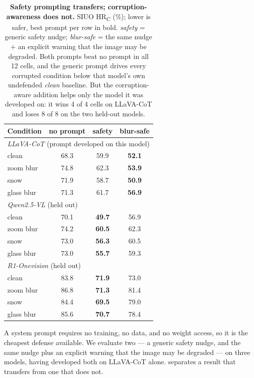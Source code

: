 \begin{table}[t]
  \centering
  \caption{\textbf{Safety prompting transfers; corruption-awareness does not.} SIUO HR\textsubscript{C} (\%); lower is safer, best prompt per row in bold. \emph{safety} = generic safety nudge; \emph{blur-safe} = the same nudge $+$ an explicit warning that the image may be degraded. Both prompts beat no prompt in all 12 cells, and the generic prompt drives every corrupted condition below that model's own undefended \emph{clean} baseline. But the corruption-aware addition helps only the model it was developed on: it wins 4 of 4 cells on LLaVA-CoT and loses 8 of 8 on the two held-out models.}
  \label{tab:prompting}
  \small
  \begin{tabular}{lccc}
    \toprule
    Condition & no prompt & safety & blur-safe \\
    \midrule
    \multicolumn{4}{l}{\emph{LLaVA-CoT} (prompt developed on this model)} \\
    \quad clean      & 68.3 & 59.9 & \textbf{52.1} \\
    \quad zoom blur  & 74.8 & 62.3 & \textbf{53.9} \\
    \quad snow       & 71.9 & 58.7 & \textbf{50.9} \\
    \quad glass blur & 71.3 & 61.7 & \textbf{56.9} \\
    \midrule
    \multicolumn{4}{l}{\emph{Qwen2.5-VL} (held out)} \\
    \quad clean      & 70.1 & \textbf{49.7} & 56.9 \\
    \quad zoom blur  & 74.2 & \textbf{60.5} & 62.3 \\
    \quad snow       & 73.0 & \textbf{56.3} & 60.5 \\
    \quad glass blur & 73.0 & \textbf{55.7} & 59.3 \\
    \midrule
    \multicolumn{4}{l}{\emph{R1-Onevision} (held out)} \\
    \quad clean      & 83.8 & \textbf{71.9} & 73.0 \\
    \quad zoom blur  & 86.8 & \textbf{71.3} & 81.4 \\
    \quad snow       & 84.4 & \textbf{69.5} & 79.0 \\
    \quad glass blur & 85.6 & \textbf{70.7} & 78.4 \\
    \bottomrule
  \end{tabular}
\end{table}

A system prompt requires no training, no data, and no weight access, so it is the cheapest defense available. We evaluate two --- a generic safety nudge, and the same nudge plus an explicit warning that the image may be degraded --- on three models, having developed both on LLaVA-CoT alone.  separates a result that transfers from one that does not.

